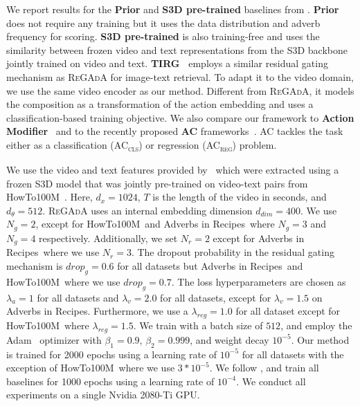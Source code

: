 \documentclass[table]{bmvc2k}
\newcommand{\modelName}{\textsc{ReGAdA}\xspace}
\newcommand{\howto}{HowTo100M}
\newcommand{\air}{Adverbs in Recipes}
\newcommand{\accls}{AC\textsubscript{\textsc{cls}}}
\newcommand{\acreg}{AC\textsubscript{\textsc{reg}}}
\begin{document}
We report results for the \textbf{Prior} and \textbf{S3D pre-trained} baselines from \cite{moltisanti2023learning}. \textbf{Prior} does not require any training but it uses the data distribution and adverb frequency for scoring. 
\textbf{S3D pre-trained} is also training-free and uses the similarity between frozen video and text representations from the S3D backbone jointly trained on video and text.
\textbf{TIRG~\cite{vo2019composing}} employs a similar residual gating mechanism as \modelName for image-text retrieval. To adapt it to the video domain, we use the same video encoder as our method. Different from \modelName, it models the composition as a transformation of the action embedding and uses a classification-based training objective.
We also compare our framework to \textbf{Action Modifier}~\cite{doughty_action_2020} and to the recently proposed \textbf{AC} frameworks~\cite{moltisanti2023learning}. AC tackles the task either as a classification (\accls) or regression (\acreg) problem. 

 \label{implementation_details}
We use the video and text features provided by~\cite{moltisanti2023learning} which were extracted using a frozen S3D model that was jointly pre-trained on video-text pairs from HowTo100M~\cite{miech2019howto100m}. Here, $d_{x} = 1024$, $T$ is the length of the video in seconds, and $d_{\theta}=512$.
\modelName uses an internal embedding dimension $d_{dim}=400$.
We use $N_{g}=2$, except for \howto\ and \air\ where $N_g=3$ and $N_g=4$ respectively. Additionally, we set $N_r=2$ except for \air\ where we use $N_r=3$. The dropout probability in the residual gating mechanism is $drop_{g}=0.6$ for all datasets but \air\ and \howto\ where we use $drop_{g}=0.7$. The loss hyperparameters are chosen as $\lambda_{a}=1$ for all datasets and $\lambda_{v}=2.0$ for all datasets, except for $\lambda_{v}=1.5$ on \air. Furthermore, we use a $\lambda_{reg}=1.0$ for all dataset except for \howto\ where $\lambda_{reg}=1.5$.
We train with a batch size of $512$, and employ the Adam~\cite{kingma2014adam} optimizer with $\beta_1 = 0.9$, $\beta_2 = 0.999$, and weight decay $10^{-5}$. Our method is trained for 2000 epochs using a learning rate of $10^{-5}$ for all datasets with the exception of \howto\ where we use $3*10^{-5}$. We follow \cite{moltisanti2023learning}, and train all baselines for 1000 epochs using a learning rate of $10^{-4}$. 
We conduct all experiments on a single Nvidia 2080-Ti GPU. 
\end{document}

